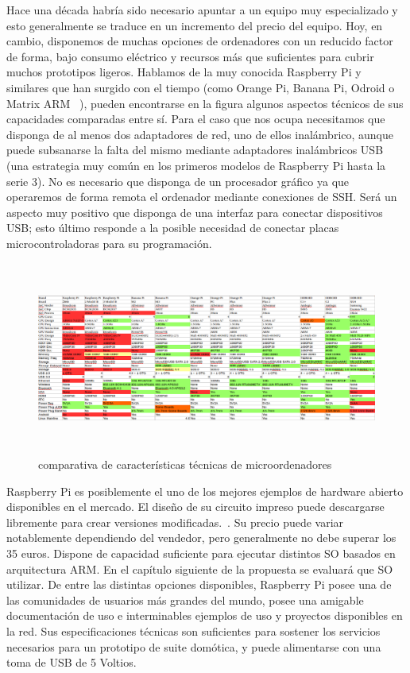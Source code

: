 Hace una década habría sido necesario apuntar a un equipo muy especializado y esto generalmente se traduce en un incremento del precio del equipo. Hoy, en cambio, disponemos de muchas opciones de ordenadores con un reducido factor de forma, bajo consumo eléctrico y recursos más que suficientes para cubrir muchos prototipos ligeros. Hablamos de la muy conocida Raspberry Pi y similares que han surgido con el tiempo (como Orange Pi, Banana Pi, Odroid o Matrix ARM ~\cite{lignuxComparative}), pueden encontrarse en la figura  algunos aspectos técnicos de sus capacidades comparadas entre sí.
Para el caso que nos ocupa necesitamos que disponga de al menos dos adaptadores de red, uno de ellos inalámbrico, aunque puede subsanarse la falta del mismo mediante adaptadores inalámbricos USB (una estrategia muy común en los primeros modelos de Raspberry Pi hasta la serie 3). No es necesario que disponga de un procesador gráfico ya que operaremos de forma remota el ordenador mediante conexiones de SSH. Será un aspecto muy positivo que disponga de una interfaz para conectar dispositivos USB; esto último responde a la posible necesidad de conectar placas microcontroladoras para su programación.

\begin{figure}[hbt!]
\centering
\includegraphics[height=2.5in]{figures/comparativaOrdenadores.png}
\caption[Comparativas de microordenadores]{comparativa de características técnicas de microordenadores\footnotemark}
\end{figure}


Raspberry Pi es posiblemente el uno de los mejores ejemplos de hardware abierto disponibles en el mercado. El diseño de su circuito impreso puede descargarse libremente para crear versiones modificadas.~\cite{raspberry_schematics}. Su precio puede variar notablemente dependiendo del vendedor, pero generalmente no debe superar los 35 euros. Dispone de capacidad suficiente para ejecutar distintos SO basados en arquitectura ARM. En el capítulo siguiente de la propuesta se evaluará que SO utilizar. De entre las distintas opciones disponibles, Raspberry Pi posee una de las comunidades de usuarios más grandes del mundo, posee una amigable documentación de uso e interminables ejemplos de uso y proyectos disponibles en la red. Sus especificaciones técnicas son suficientes para sostener los servicios necesarios para un prototipo de suite domótica, y puede alimentarse con una toma de USB de 5 Voltios.

